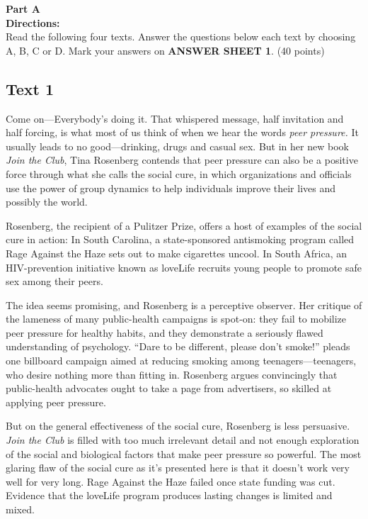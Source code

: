 \noindent
\textbf{Part A}\\
\textbf{Directions:}\\
Read the following four texts. Answer the questions below each
	text by choosing A, B, C or
	D. Mark your answers on \textbf{ANSWER SHEET 1}. (40
	points)

\newpage
\subsection{Text 1}


Come on---Everybody's doing it. That whispered message, half
invitation and half forcing, is what most of us think of when we hear
the words \emph{peer pressure.} It usually leads to no good---drinking, drugs and casual sex.
But in her new book \emph{Join the Club}, Tina Rosenberg contends that peer pressure can also be a positive
force through what she calls the social cure, in which organizations and
officials use the power of group dynamics to help individuals improve
their lives and possibly the world.

Rosenberg, the recipient of a Pulitzer Prize, offers a host of examples
of the social cure in action: In South Carolina, a state-sponsored
antismoking program called Rage Against the Haze sets out to make
cigarettes uncool. In South Africa, an HIV-prevention initiative known
as loveLife recruits young people to promote safe sex among their peers.

The idea seems promising, and Rosenberg is a perceptive observer. Her
critique of the lameness of many public-health campaigns is
spot-on: they fail to mobilize peer pressure for healthy habits, and
they demonstrate a seriously flawed understanding of psychology. ``Dare
to be different, please don't smoke!'' pleads one billboard campaign
aimed at reducing smoking among teenagers---teenagers, who desire
nothing more than fitting in. Rosenberg argues convincingly that
public-health advocates ought to take a page from advertisers, so
skilled at applying peer pressure.

But on the general effectiveness of the social cure, Rosenberg is less
persuasive. \emph{Join the Club} is filled with too much irrelevant
detail and not enough exploration of the social and biological factors
that make peer pressure so powerful. The most glaring flaw of the social
cure as it's presented here is that it doesn't work very well for very
long. Rage Against the Haze failed once state funding was cut. Evidence
that the loveLife program produces lasting changes is limited and mixed.

